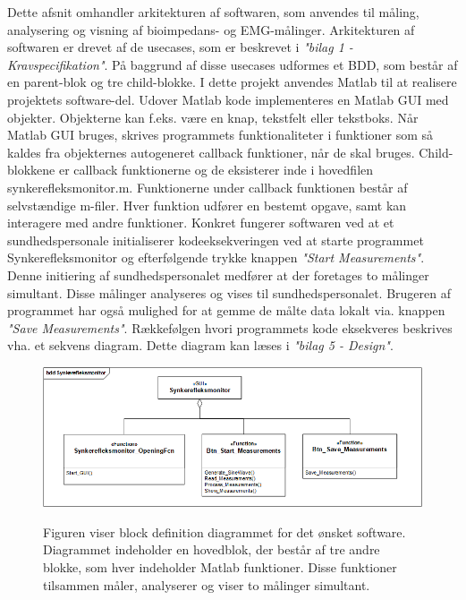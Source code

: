 Dette afsnit omhandler arkitekturen af softwaren, som anvendes til måling, analysering og visning af bioimpedans- og EMG-målinger. Arkitekturen af softwaren er drevet af de usecases, som er beskrevet i \textit{"bilag 1 - Kravspecifikation"}. På baggrund af disse usecases udformes et BDD, som består af en parent-blok og tre child-blokke. I dette projekt anvendes  Matlab til at realisere projektets  software-del. Udover Matlab kode implementeres en Matlab GUI med objekter. Objekterne kan f.eks. være en knap, tekstfelt eller tekstboks. Når Matlab GUI bruges, skrives programmets funktionaliteter i funktioner som så kaldes fra objekternes autogeneret callback funktioner, når de skal bruges. Child-blokkene er callback funktionerne og de eksisterer inde i hovedfilen synkerefleksmonitor.m. Funktionerne under callback funktionen består af selvstændige m-filer. Hver funktion udfører en bestemt opgave, samt kan interagere med andre funktioner. Konkret fungerer softwaren ved at et sundhedspersonale initialiserer kodeeksekveringen ved at starte programmet Synkerefleksmonitor og efterfølgende trykke knappen \textit{"Start Measurements"}. Denne initiering af sundhedspersonalet medfører at der foretages to målinger simultant. Disse målinger analyseres og vises til sundhedspersonalet. Brugeren af programmet har også mulighed for at gemme de målte data lokalt via. knappen \textit{"Save Measurements"}. Rækkefølgen hvori programmets kode eksekveres beskrives vha. et sekvens diagram. Dette diagram kan læses i \textit{"bilag 5 - Design"}.    

\begin{figure}[H] 
\centering
{\includegraphics[width=\linewidth]
{Figure/SWIBD}}
\caption{Figuren viser block definition diagrammet for det ønsket software. Diagrammet indeholder en hovedblok, der består af tre andre blokke, som hver indeholder Matlab funktioner. Disse funktioner tilsammen måler, analyserer og viser to målinger simultant.}
\label{figScrip}
\end{figure}


\citep{Aroom2009}

